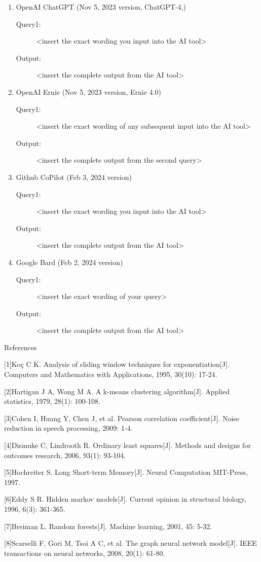 \documentclass{mcmthesis}
\begin{document}
\begin{enumerate}   %
\item OpenAI ChatGPT (Nov 5, 2023 version, ChatGPT-4,)  %
\begin{description}     %
\item[Query1:] <insert the exact wording you input into the AI tool> 
\item[Output:] <insert the complete output from the AI tool>
\end{description}
\item OpenAI Ernie (Nov 5, 2023 version, Ernie 4.0) 
\begin{description}
\item[Query1:] <insert the exact wording of any subsequent input into the AI tool> 
\item[Output:] <insert the complete output from the second query>
\end{description}
\item Github CoPilot (Feb 3, 2024 version) 
\begin{description}
\item[Query1:] <insert the exact wording you input into the AI tool> 
\item[Output:] <insert the complete output from the AI tool>
\end{description}
\item Google Bard (Feb 2, 2024 version) 
\begin{description}
\item[Query1:] <insert the exact wording of your query> 
\item[Output:] <insert the complete output from the AI tool>
\end{description}
\end{enumerate}

\newpage

{\LARGE References}

[1]Koç C K. Analysis of sliding window techniques for exponentiation[J]. Computers and Mathematics with Applications, 1995, 30(10): 17-24.

[2]Hartigan J A, Wong M A. A k-means clustering algorithm[J]. Applied statistics, 1979, 28(1): 100-108.

[3]Cohen I, Huang Y, Chen J, et al. Pearson correlation coefficient[J]. Noise reduction in speech processing, 2009: 1-4.

[4]Dismuke C, Lindrooth R. Ordinary least squares[J]. Methods and designs for outcomes research, 2006, 93(1): 93-104.

[5]Hochreiter S. Long Short-term Memory[J]. Neural Computation MIT-Press, 1997.

[6]Eddy S R. Hidden markov models[J]. Current opinion in structural biology, 1996, 6(3): 361-365.

[7]Breiman L. Random forests[J]. Machine learning, 2001, 45: 5-32.

[8]Scarselli F, Gori M, Tsoi A C, et al. The graph neural network model[J]. IEEE transactions on neural networks, 2008, 20(1): 61-80.
\end{document}
